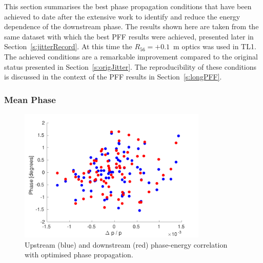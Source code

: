 

This section summarises the best phase propagation conditions that have been achieved to date after the extensive work to identify and reduce the energy dependence of the downstream phase. The results shown here are taken from the same dataset with which the best PFF results were achieved, presented later in Section~\ref{s:jitterRecord}. At this time the \(R_{56} = +0.1\)~m optics was used in TL1. The achieved conditions are a remarkable improvement compared to the original status presented in Section~\ref{s:origJitter}. The reproducibility of these conditions is discussed in the context of the PFF results in Section~\ref{s:longPFF}.

\subsubsection{Mean Phase}

\begin{figure}
  \centering
  \includegraphics[width=0.8\textwidth]{Figures/propagation/bestProp_enCorr}
  \caption{Upstream (blue) and downstream (red) phase-energy correlation with optimised phase propagation.}
  \label{f:bestProp_enCorr}
\end{figure}

